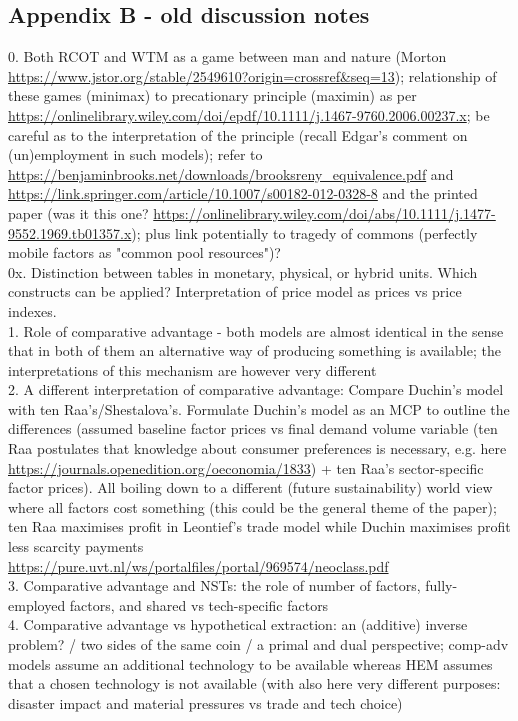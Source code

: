 \documentclass{article}
\begin{document}
\begin{refsection}
\section*{Appendix B - old discussion notes}
0. Both RCOT and WTM as a game between man and nature (Morton \url{https://www.jstor.org/stable/2549610?origin=crossref&seq=13}); relationship of these games (minimax) to precationary principle (maximin) as per \url{https://onlinelibrary.wiley.com/doi/epdf/10.1111/j.1467-9760.2006.00237.x}; be careful as to the interpretation of the principle (recall Edgar's comment on (un)employment in such models); refer to \url{https://benjaminbrooks.net/downloads/brooksreny_equivalence.pdf} and \url{https://link.springer.com/article/10.1007/s00182-012-0328-8} and the printed paper (was it this one? \url{https://onlinelibrary.wiley.com/doi/abs/10.1111/j.1477-9552.1969.tb01357.x}); plus link potentially to tragedy of commons (perfectly mobile factors as "common pool resources")? \\
0x. Distinction between tables in monetary, physical, or hybrid units. Which constructs can be applied? Interpretation of price model as prices vs price indexes.\\
1. Role of comparative advantage - both models are almost identical in the sense that in both of them an alternative way of producing something is available; the interpretations of this mechanism are however very different \\
2. A different interpretation of comparative advantage: Compare Duchin's model with ten Raa's/Shestalova's. Formulate Duchin's model as an MCP to outline the differences (assumed baseline factor prices vs final demand volume variable (ten Raa postulates that knowledge about consumer preferences is necessary, e.g. here \url{https://journals.openedition.org/oeconomia/1833}) + ten Raa's sector-specific factor prices). All boiling down to a different (future sustainability) world view where all factors cost something (this could be the general theme of the paper); ten Raa maximises profit in Leontief's trade model while Duchin maximises profit less scarcity payments \url{https://pure.uvt.nl/ws/portalfiles/portal/969574/neoclass.pdf}\\
3. Comparative advantage and NSTs: the role of number of factors, fully-employed factors, and shared vs tech-specific factors \\
4. Comparative advantage vs hypothetical extraction: an (additive) inverse problem? / two sides of the same coin / a primal and dual perspective; comp-adv models assume an additional technology to be available whereas HEM assumes that a chosen technology is not available (with also here very different purposes: disaster impact and material pressures vs trade and tech choice) \\

\end{refsection}
\end{document}
